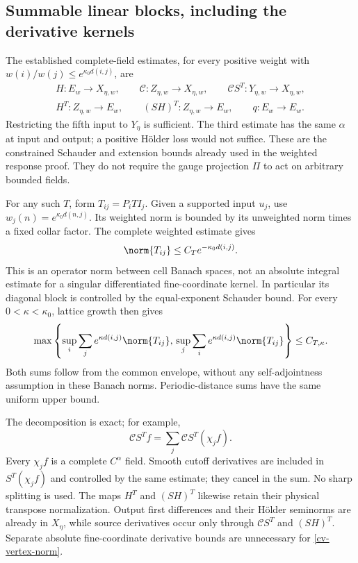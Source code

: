 \subsection{Summable linear blocks, including the derivative kernels}
\label{cv-linear-section}

The established complete-field estimates, for every positive
weight with $w(i)/w(j)\le e^{\kappa_0d(i,j)}$, are
\begin{equation}\label{cv-linear-inputs}
 \begin{gathered}
 H:E_w\to X_{\eta,w},\qquad
 \mathcal C:Z_{\eta,w}\to X_{\eta,w},\qquad
 \mathcal CS^T:Y_{\eta,w}\to X_{\eta,w},\\
 H^T:Z_{\eta,w}\to E_w,\qquad
 (SH)^T:Z_{\eta,w}\to E_w,\qquad q:E_w\to E_w.
 \end{gathered}
\end{equation}
Restricting the fifth input to $Y_\eta$ is sufficient.
The third estimate has the same $\alpha$ at input and
output; a positive H\"older loss would not suffice.
These are the constrained Schauder and extension bounds
already used in the weighted response proof. They do not
require the gauge projection $\Pi$ to act on arbitrary
bounded fields.

For any such $T$, form $T_{ij}=P_iTI_j$. Given a supported
input $u_j$, use $w_j(n)=e^{\kappa_0d(n,j)}$. Its weighted
norm is bounded by its unweighted norm times a fixed collar
factor. The complete weighted estimate gives
\begin{equation}\label{cv-block-envelope}
 \norm{T_{ij}}\le C_Te^{-\kappa_0d(i,j)}.
\end{equation}
This is an operator norm between cell Banach spaces, not an
absolute integral estimate for a singular differentiated
fine-coordinate kernel. In particular its diagonal block is
controlled by the equal-exponent Schauder bound.
For every $0<\kappa<\kappa_0$, lattice growth then gives
\begin{equation}\label{cv-block-schur}
 \max\left\{
  \sup_i\sum_je^{\kappa d(i,j)}\norm{T_{ij}},\,
  \sup_j\sum_ie^{\kappa d(i,j)}\norm{T_{ij}}\right\}
                \le C_{T,\kappa}.
\end{equation}
Both sums follow from the common envelope, without any
self-adjointness assumption in these Banach norms.
Periodic-distance sums have the same uniform upper bound.

The decomposition is exact; for example,
\begin{equation}\label{cv-exact-linear-splitting}
 \mathcal CS^Tf=\sum_j\mathcal CS^T(\chi_jf).
\end{equation}
Every $\chi_jf$ is a complete $C^\alpha$ field. Smooth
cutoff derivatives are included in $S^T(\chi_jf)$ and
controlled by the same estimate; they cancel in the sum.
No sharp splitting is used. The maps $H^T$ and $(SH)^T$
likewise retain their physical transpose normalization.
Output first differences and their H\"older seminorms are
already in $X_\eta$, while source derivatives occur only
through $\mathcal CS^T$ and $(SH)^T$. Separate absolute
fine-coordinate derivative bounds are unnecessary for
\eqref{cv-vertex-norm}.

